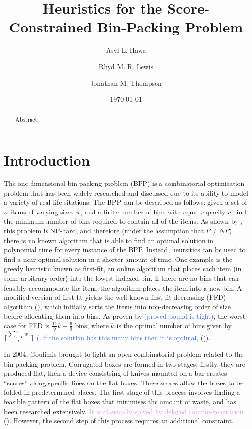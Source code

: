 \documentclass[oribibl]{llncs}
\title{Heuristics for the Score-Constrained Bin-Packing Problem}
\author{Asyl L. Hawa \and Rhyd M. R. Lewis \and Jonathan M. Thompson}
\institute{School of Mathematics, Cardiff University, Senghennydd Road, Cardiff, UK, CF24 4AG}
\date{\today}
\begin{document}
\maketitle

\begin{abstract}
	Abstract
\end{abstract}


\section{Introduction}
\label{sec:intro}
The one-dimensional bin packing problem (BPP) is a combinatorial optimisation problem that has been widely researched and discussed due to its ability to model a variety of real-life sitations.
The BPP can be described as follows: given a set of $n$ items of varying sizes $w$, and a finite number of bins with equal capacity $c$, find the minimum number of bins required to contain all of the items. As shown by \cite{garey1979}, this problem is NP-hard, and therefore (under the assumption that $P \neq NP$) there is no known algorithm that is able to find an optimal solution in polynomial time for every instance of the BPP. Instead, heursitics can be used to find a near-optimal solution in a shorter amount of time. One example is the greedy heuristic known as first-fit, an online algorithm that places each item (in some arbitrary order) into the lowest-indexed bin. If there are no bins that can feasibly accommodate the item, the algorithm places the item into a new bin. A modified version of first-fit yields the well-known first-fit decreasing (FFD) algorithm (\citealp{eilon1971}), which initially sorts the items into non-decreasing order of size before allocating them into bins. As proven by \cite{dosa2007} \textcolor{RoyalBlue}{(proved bound is tight)}, the worst case for FFD is $\frac{11}{9}k + \frac{6}{9}$ bins, where $k$ is the optimal number of bins given by $\lceil\frac{\sum_{i=1}^{n} w_{i}}{c}\rceil$ \textcolor{RoyalBlue}{(..if the solution has this many bins then it is optimal,} (\citealp{korf2002})).

In 2004, Goulimis brought to light an open-combinatorial problem related to the bin-packing problem. Corrugated boxes are formed in two stages: firstly, they are produced flat, then a device consistsing of knives mounted on a bar creates ``scores'' along specific lines on the flat boxes. These scores allow the boxes to be folded in predetermined places. The first stage of this process involves finding a feasible pattern of the flat boxes that minimises the amount of waste, and has been researched extensively. \textcolor{Plum}{It is classically solved by delayed column-generation} (\citealp{gilmore1961, gilmore1963}). However, the second step of this process requires an additional constraint.
\end{document}
